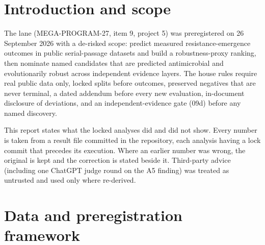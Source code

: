 \documentclass[11pt,letterpaper]{article}
\begin{document}
\section{Introduction and scope}
The lane (MEGA-PROGRAM-27, item 9, project 5) was preregistered on 26 September 2026 with a de-risked scope: predict measured resistance-emergence outcomes in public serial-passage datasets and build a robustness-proxy ranking, then nominate named candidates that are predicted antimicrobial and evolutionarily robust across independent evidence layers. The house rules require real public data only, locked splits before outcomes, preserved negatives that are never terminal, a dated addendum before every new evaluation, in-document disclosure of deviations, and an independent-evidence gate (09d) before any named discovery.

This report states what the locked analyses did and did not show. Every number is taken from a result file committed in the repository, each analysis having a lock commit that precedes its execution. Where an earlier number was wrong, the original is kept and the correction is stated beside it. Third-party advice (including one ChatGPT judge round on the A5 finding) was treated as untrusted and used only where re-derived.

\section{Data and preregistration framework}
\end{document}
